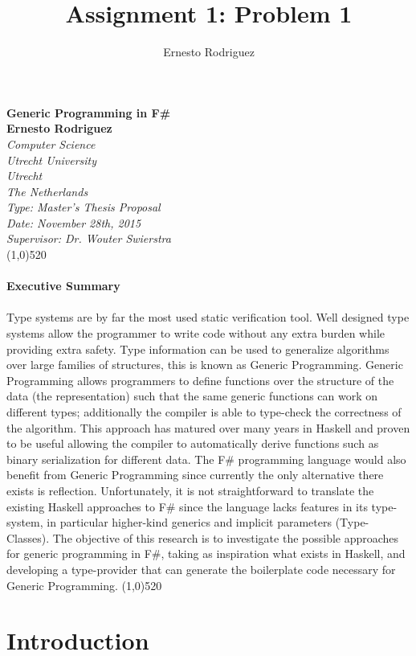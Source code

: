\documentclass[8pt]{extarticle}
\title{Assignment 1: Problem 1}
\author{Ernesto Rodriguez}
\begin{document}
\Huge{\bf Generic Programming in F\#\\[1cm]}
\large{\bf Ernesto Rodriguez\\[0.5cm]}
\emph{Computer Science \\ Utrecht University \\ Utrecht \\ The Netherlands \\[0.5cm]}
\emph{Type: Master's Thesis Proposal \\ Date: November 28th, 2015 \\ Supervisor: Dr. Wouter Swierstra\\}
\line(1,0){520}\\ \\
\Large{\bf Executive Summary\\ \\}
Type systems are by far the most used static verification tool. Well designed type systems allow the programmer to write code without any extra burden while providing extra safety. Type information can be used to generalize algorithms over large families of structures, this is known as Generic Programming. Generic Programming allows programmers to define functions over the structure of the data (the representation) such that the same generic functions can work on different types; additionally the compiler is able to type-check the correctness of the algorithm. This approach has matured over many years in Haskell and proven to be useful allowing the compiler to automatically derive functions such as binary serialization for different data. The F\# programming language would also benefit from Generic Programming since currently the only alternative there exists is reflection. Unfortunately, it is not straightforward to translate the existing Haskell approaches to F\# since the language lacks features in its type-system, in particular higher-kind generics and implicit parameters (Type-Classes). The objective of this research is to investigate the possible approaches for generic programming in F\#, taking as inspiration what exists in Haskell, and developing a type-provider that can generate the boilerplate code necessary for Generic Programming.
\line(1,0){520}
\section{Introduction}
\end{document}
